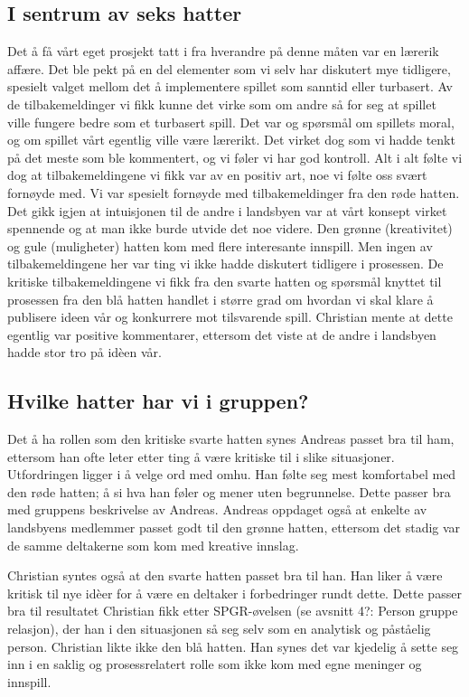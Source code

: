 \subsection{I sentrum av seks hatter}
Det å få vårt eget prosjekt tatt i fra hverandre på denne måten var en lærerik affære. Det ble pekt på en del elementer som vi selv har diskutert mye tidligere, spesielt valget mellom det å implementere spillet som sanntid eller turbasert. Av de tilbakemeldinger vi fikk kunne det virke som om andre så for seg at spillet ville fungere bedre som et turbasert spill. Det var og spørsmål om spillets moral, og om spillet vårt egentlig ville være lærerikt. Det virket dog som vi hadde tenkt på det meste som ble kommentert, og vi føler vi har god kontroll. Alt i alt følte vi dog at tilbakemeldingene vi fikk var av en positiv art, noe vi følte oss svært fornøyde med. Vi var spesielt fornøyde med tilbakemeldinger fra den røde hatten. Det gikk igjen at intuisjonen til de andre i landsbyen var at vårt konsept virket spennende og at man ikke burde utvide det noe videre. Den grønne (kreativitet) og gule (muligheter) hatten kom med flere interesante innspill. Men ingen av tilbakemeldingene her var ting vi ikke hadde diskutert tidligere i prosessen. De kritiske tilbakemeldingene vi fikk fra den svarte hatten og spørsmål knyttet til prosessen fra den blå hatten handlet i større grad om hvordan vi skal klare å publisere ideen vår og konkurrere mot tilsvarende spill. Christian mente at dette egentlig var positive kommentarer, ettersom det viste at de andre i landsbyen hadde stor tro på idèen vår. 


\subsection{Hvilke hatter har vi i gruppen?}
Det å ha rollen som den kritiske svarte hatten synes Andreas passet bra til ham, ettersom han ofte leter etter ting å være kritiske til i slike situasjoner. Utfordringen ligger i å velge ord med omhu. Han følte seg mest komfortabel med den røde hatten; å si hva han føler og mener uten begrunnelse. Dette passer bra med gruppens beskrivelse av Andreas. Andreas oppdaget også at enkelte av landsbyens medlemmer passet godt til den grønne hatten, ettersom det stadig var de samme deltakerne som kom med kreative innslag.

Christian syntes også at den svarte hatten passet bra til han. Han liker å være kritisk til nye idèer for å være en deltaker i forbedringer rundt dette. Dette passer bra til resultatet Christian fikk etter SPGR-øvelsen (se avsnitt 4?: Person gruppe relasjon), der han i den situasjonen så seg selv som en analytisk og påståelig person. Christian likte ikke den blå hatten. Han synes det var kjedelig å sette seg inn i en saklig og prosessrelatert rolle som ikke kom med egne meninger og innspill.

